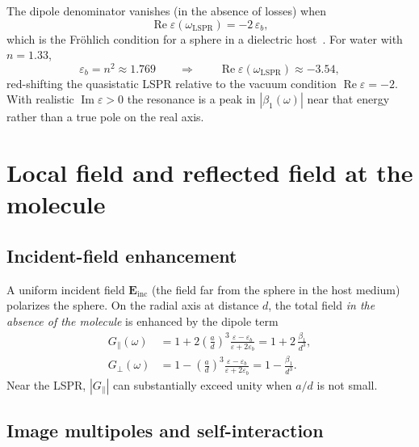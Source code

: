 \documentclass[11pt,a4paper]{article}
\begin{document}
The dipole denominator vanishes (in the absence of losses) when
\begin{equation}
  \operatorname{Re}\varepsilon(\omega_{\mathrm{LSPR}}) = -2\,\varepsilon_b,
  \label{eq:frohlich}
\end{equation}
which is the Fr\"{o}hlich condition for a sphere in a dielectric host~\citep{frohlich1958,bohren1983,maier2007}.  For
water with $n=1.33$,
\begin{equation}
  \varepsilon_b = n^2 \approx 1.769
  \qquad\Rightarrow\qquad
  \operatorname{Re}\varepsilon(\omega_{\mathrm{LSPR}}) \approx -3.54,
\end{equation}
red-shifting the quasistatic LSPR relative to the vacuum condition
$\operatorname{Re}\varepsilon=-2$.  With realistic $\operatorname{Im}\varepsilon>0$
the resonance is a peak in $|\beta_1(\omega)|$ near that energy rather than a true
pole on the real axis.

\section{Local field and reflected field at the molecule}
\label{sec:fields}

\subsection{Incident-field enhancement}

A uniform incident field $\mathbf{E}_{\mathrm{inc}}$ (the field far from the
sphere in the host medium) polarizes the sphere.  On the radial axis at distance
$d$, the total field \emph{in the absence of the molecule} is enhanced by the
dipole term~\citep{bohren1983,novotny2012}
\begin{align}
  G_\parallel(\omega)
  &=
  1 + 2
  \left(\frac{a}{d}\right)^3
  \frac{\varepsilon-\varepsilon_b}{\varepsilon+2\varepsilon_b}
  =
  1 + 2\,\frac{\beta_1}{d^3},
  \label{eq:Gpar} \\[0.35em]
  G_\perp(\omega)
  &=
  1 -
  \left(\frac{a}{d}\right)^3
  \frac{\varepsilon-\varepsilon_b}{\varepsilon+2\varepsilon_b}
  =
  1 - \frac{\beta_1}{d^3}.
  \label{eq:Gperp}
\end{align}
Near the LSPR, $|G_\parallel|$ can substantially exceed unity when $a/d$ is not
small.

\subsection{Image multipoles and self-interaction}
\end{document}
